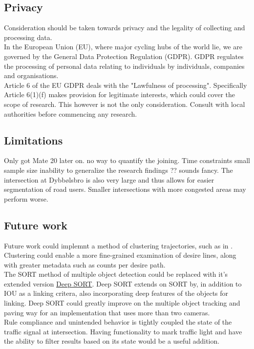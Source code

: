 \subsection{Privacy}

Consideration should be taken towards privacy and the legality of collecting and processing data.
\ \\
In the European Union (EU), where major cycling hubs of the world lie, we are governed by 
the General Data Protection Regulation (GDPR). GDPR regulates the processing of personal data 
relating to individuals by individuals, companies and organisations.
\ \\
Article 6 of the EU GDPR deals with the "Lawfulness of processing". Specifically Article 6(1)(f)
makes provision for legitimate interests, which could cover the scope of research.
This however is not the only consideration. Consult with local authorities before commencing any research.

\subsection{Limitations}
Only got Mate 20 later on.
no way to quantify the joining.
Time constraints
small sample size
inability to generalize the research findings ?? sounds fancy.
The intersection at Dybbølsbro is also very large and thus allows for easier segmentation of road users. 
Smaller intersections with more congested areas may perform worse. 
\ \\

\subsection{Future work}

Future work could implemnt a method of clustering trajectories,
such as in \cite{gariel_trajectory_2011}. Clustering could enable a more fine-grained examination of desire lines,
along with greater metadata such as counts per desire path.
\ \\

The SORT method of multiple object detection could be replaced with it's extended version \href{https://github.com/nwojke/deep_sort}{Deep SORT}.
Deep SORT extends on SORT by, in addition to IOU as a linking critera, also incorporating
deep features of the objects for linking. Deep SORT could greatly improve on the multiple object tracking
and paving way for an implementation that uses more than two cameras.
\ \\

Rule compliance and unintended behavior is tightly coupled the state of the traffic signal at intersection. 
Having functionality to mark traffic light and have the ability to filter results based on its state would
be a useful addition. 